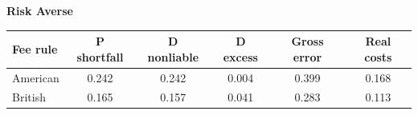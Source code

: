 \documentclass[10pt,border=5pt,varwidth=17cm]{standalone}
\begin{document}
\begingroup
\small
\setlength{\tabcolsep}{5pt}
\renewcommand{\arraystretch}{1.20}
\noindent\textbf{Risk Averse}\par\smallskip
\noindent\begin{tabularx}{\linewidth}{@{}>{\raggedright\arraybackslash}Xccccc@{}}
\toprule
\textbf{Fee rule} & \textbf{P shortfall} & \textbf{D nonliable} & \textbf{D excess} & \textbf{Gross error} & \textbf{Real costs} \\
\midrule
American & 0.242 & 0.242 & 0.004 & 0.399 & 0.168 \\
British & 0.165 & 0.157 & 0.041 & 0.283 & 0.113 \\
\bottomrule\end{tabularx}\par\medskip
\endgroup
\end{document}

